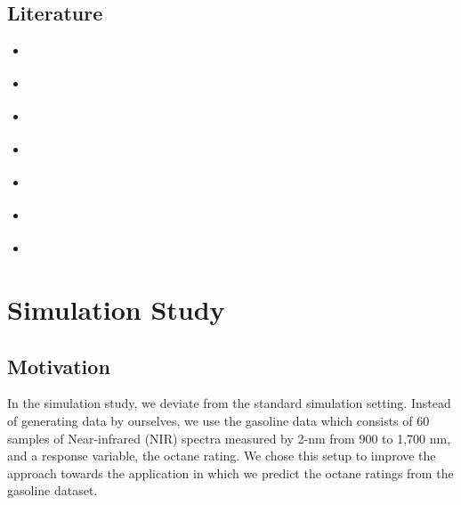 \documentclass[11pt,twoside,a4paper]{article}
\begin{document}
	\subsection{Literature}
	\begin{itemize}
		\item \cite{alexanderian_KLexpansion_2015}
		\item \cite{kokoszka_introduction_2017}
		\item \cite{hsing_theoretical_2015}
		\item \cite{ramsay_functional_2005}
		\item \cite{horvath_inference_2012}
		\item \cite{cai_prediction_2006}
		\item \cite{levitin_introduction_2007}
	\end{itemize}
	
	\newpage
	\section{Simulation Study}
	

	\subsection{Motivation}
	
	
	
	In the simulation study, we deviate from the standard simulation setting. Instead of generating data by ourselves, we use the gasoline data which consists of 60 samples of Near-infrared (NIR) spectra measured by 2-nm from 900 to 1,700 nm, and a response variable,  the octane rating. We chose this setup to improve the approach towards the application in which we  predict the octane ratings from the gasoline dataset.	
	
\end{document}
